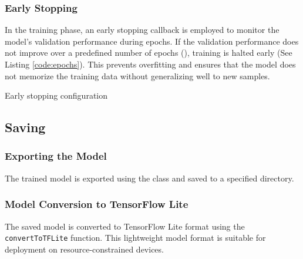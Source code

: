 \subsubsection{Early Stopping}

In the training phase, an early stopping callback is employed to monitor the model's validation performance during epochs. If the validation performance does not improve over a predefined number of epochs (), training is halted early (See Listing \ref{code:epochs}). This prevents overfitting and ensures that the model does not memorize the training data without generalizing well to new samples.


\begin{code}[h!]
	    
	
	\caption{Early stopping configuration}
	\label{code:epochs}
\end{code}


\subsection{Saving}

\subsubsection{Exporting the Model}

The trained model is exported using the  class and saved to a specified directory. 

\begin{code}[h!]
	    
	
	\caption{}
	\label{code:ExportingModel}
\end{code}
	
\subsubsection{Model Conversion to TensorFlow Lite}

The saved model is converted to TensorFlow Lite format using the \texttt{convertToTFLite} function. This lightweight model format is suitable for deployment on resource-constrained devices.

\begin{code}[h!]
	    
	
	\caption{}
	\label{code:TFLiteConversion}
\end{code}


